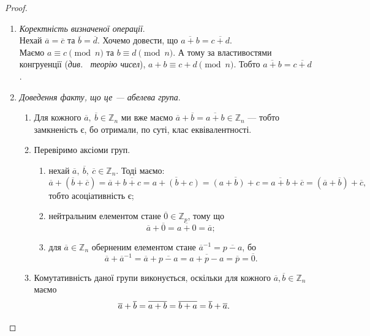 \documentclass{math_library}
\begin{document}
\begin{proof}
\begin{enumerate}[topsep=0pt,wide=0pt,label={\Roman*.}]
\item \textit{Коректність визначеної операції}.\\
Нехай $\overline{a} = \overline{c}$ та $\overline{b} = \overline{d}$. Хочемо довести, що $\overline{a+b} = \overline{c+d}$.\\
Маємо $a \equiv c \pmod n$ та $b \equiv d \pmod n$. А тому за властивостями конгруенції (\textit{див.~ теорію чисел}), $a+b \equiv c+d \pmod n$. Тобто $\overline{a+b} = \overline{c+d}$.

\item \textit{Доведення факту, що це --- абелева група}.
\begin{enumerate}[nosep,wide=0pt,label={\roman*.}]
\item Для кожного $\overline{a},\ \overline{b} \in \mathbb{Z}_n$ ми вже маємо $\overline{a}+\overline{b} = \overline{a+b} \in \mathbb{Z}_n$ --- тобто замкненість є, бо отримали, по суті, клас еквівалентності.
\item Перевіримо аксіоми груп.
\begin{enumerate}[nosep,label={\arabic*)}]
\item нехай $\overline{a},\ \overline{b},\ \overline{c} \in \mathbb{Z}_n$. Тоді маємо: \[
\overline{a}+(\overline{b}+\overline{c}) = \overline{a}+\overline{b+c} = \overline{a+(b+c)} = \overline{(a+b)+c} = \overline{a+b} + \overline{c} = (\overline{a}+\overline{b})+\overline{c},\]
тобто асоціативність є;
\item нейтральним елементом стане $\overline{0} \in \mathbb{Z}_p$, тому що 
\[
\overline{a} + \overline{0} = \overline{a+0} = \overline{a};
\]
\item для $\overline{a} \in \mathbb{Z}_n$ оберненим елементом стане $\overline{a}^{-1} = \overline{p-a}$, бо 
\[
\overline{a} + \overline{a}^{-1} = \overline{a} + \overline{p-a} = \overline{a+p-a} = \overline{p} = \overline{0}.
\]
\end{enumerate}
\item Комутативність даної групи виконується, оскільки для кожного $\overline{a},\overline{b} \in \mathbb{Z}_n$ маємо 
\[
 \overline{a} + \overline{b} = \overline{a+b} = \overline{b+a} = \overline{b} + \overline{a}. \qedhere 
 \]
\end{enumerate}
\end{enumerate}
\end{proof}
\end{document}
